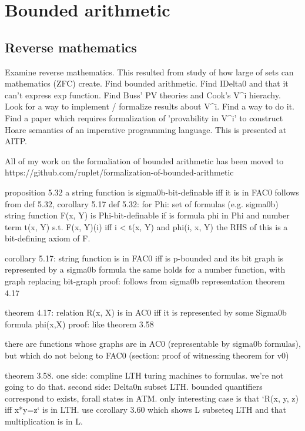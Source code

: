 \chapter{Bounded arithmetic}
\label{chap:bounded-arithmetic}



\section{Reverse mathematics}
\label{sec:aaa}


Examine reverse mathematics. This resulted from study of how large of sets can mathematics (ZFC) create. Find bounded arithmetic. Find IDelta0 and that it can't express exp function. Find Buss' PV theories and Cook's V^i hierachy. Look for
a way to implement / formalize results about V^i. Find a way to do it. Find a paper which requires formalization of 'provability in V^i' to construct Hoare semantics
of an imperative programming language. This is presented at AITP.

All of my work on the formaliation of bounded arithmetic has been moved to
https://github.com/ruplet/formalization-of-bounded-arithmetic



proposition 5.32 a string function is sigma0b-bit-definable iff it is in FAC0
follows from def 5.32, corollary 5.17
def 5.32:
for Phi: set of formulas (e.g. sigma0b)
string function F(x, Y) is Phi-bit-definable if is formula phi in Phi and number term t(x, Y) s.t.
F(x, Y)(i) iff i < t(x, Y) and phi(i, x, Y)
the RHS of this is a bit-defining axiom of F.

corollary 5.17: string function is in FAC0 iff is p-bounded
and its bit graph is represented by a sigma0b formula
the same holds for a  number function, with graph replacing bit-graph
proof: follows from sigma0b representation theorem 4.17

theorem 4.17: relation R(x, X) is in AC0 iff it is represented by some Sigma0b formula phi(x,X)
proof: like theorem 3.58

there are functions whose graphs are in AC0 (representable by sigma0b formulas),
but which do not belong to FAC0 (section: proof of witnessing theorem for v0)


theorem 3.58.
one side: compline LTH turing machines to formulas. we're not going to do that.
second side: Delta0n subset LTH.
bounded quantifiers correspond to exists, forall states in ATM.
only interesting case is that `R(x, y, z) iff x*y=z` is in LTH.
use corollary 3.60 which shows L subseteq LTH and that multiplication is in L.


